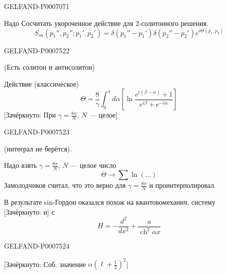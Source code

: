 \begin{GelfandAdjacentEvidence}{GELFAND-P000707}{1}


Надо Сосчитать укороченное действие для 2-солитонного решения.
\begin{equation*}
S_{sa}(p_1'',p_2'';p_1',p_2')
=\delta(p_1''-p_1')\delta(p_2''-p_2')e^{i\Theta(p_1,p_2)}
\tag{46}
\end{equation*}
\end{GelfandAdjacentEvidence}
\begin{GelfandAdjacentEvidence}{GELFAND-P000752}{2}

(Есть солитон и антисолитон)

Действие (классическое)
\begin{equation*}
\Theta=\frac8\gamma\int_0^\pi d\alpha
\left[\ln\frac{e^{i(\beta-\alpha)}+1}{e^{i\beta}+e^{-i\alpha}}\right]
\tag{47}
\end{equation*}
[Зачёркнуто: При \(\gamma=\frac{8\pi}{N}\), \(N\) --- целое]
\end{GelfandAdjacentEvidence}
\begin{GelfandAdjacentEvidence}{GELFAND-P000752}{3}

(интеграл не берётся).

Надо взять \(\gamma=\frac{8\pi}{N}\), \(N\) --- целое число
\begin{equation*}
\Theta\longrightarrow\sum\ln(\ldots)
\tag{48}
\end{equation*}
Замолодчиков считал, что это верно для \(\gamma=\frac{8\pi}{N}\) и проинтерполировал.

В результате sin-Гордон оказался похож на квантовомеханич. систему [Зачёркнуто: и] с
\begin{equation*}
H=-\frac{d^2}{dx^2}+\frac{a}{\operatorname{ch}^2\alpha x}
\tag{49}
\end{equation*}
\end{GelfandAdjacentEvidence}
\begin{GelfandAdjacentEvidence}{GELFAND-P000752}{4}

[Зачёркнуто: Соб. значение \(\alpha(\ell+\tfrac12)^2\)]
\end{GelfandAdjacentEvidence}
